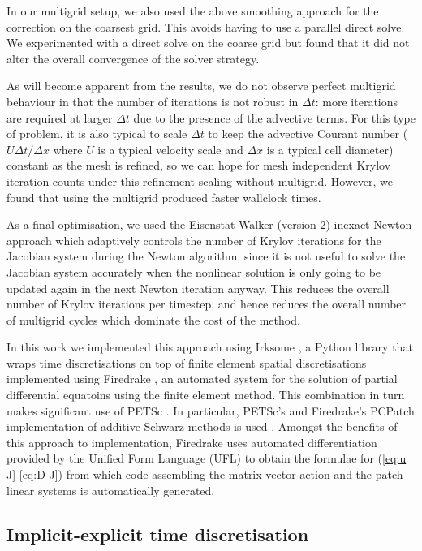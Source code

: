 \documentclass[a4paper, 12pt]{article}
\begin{document}
In our multigrid setup, we also used the above smoothing approach for
the correction on the coarsest grid. This avoids having to use a
parallel direct solve. We experimented with a direct solve on the coarse
grid but found that it did not alter the overall convergence of the
solver strategy.

As will become apparent from the results, we do not observe perfect
multigrid behaviour in that the number of iterations is not robust in
$\Delta t$: more iterations are required at larger $\Delta t$ due to
the presence of the advective terms.  For this type of problem, it is
also typical to scale $\Delta t$ to keep the advective Courant number
($U\Delta t/\Delta x$ where $U$ is a typical velocity scale and
$\Delta x$ is a typical cell diameter) constant as the mesh is
refined, so we can hope for mesh independent Krylov iteration counts
under this refinement scaling without multigrid. However, we found
that using the multigrid produced faster wallclock times.

As a final optimisation, we used the Eisenstat-Walker (version 2)
inexact Newton approach \citep{eisenstat1996choosing} which adaptively
controls the number of Krylov iterations for the Jacobian system
during the Newton algorithm, since it is not useful to solve the
Jacobian system accurately when the nonlinear solution is only going
to be updated again in the next Newton iteration anyway. This reduces the overall
number of Krylov iterations per timestep, and hence reduces the overall
number of multigrid cycles which dominate the cost of the method.

In this work we implemented this approach using Irksome
\citep{farrell2021irksome,kirby2024extending}, a Python library that
wraps time discretisations on top of finite element spatial
discretisations implemented using Firedrake
\citep{FiredrakeUserManual}, an automated system for the solution of
partial differential equatoins using the finite element method.  This
combination in turn makes significant use of PETSc
\citep{dalcin2011parallel,balay2019petsc}. In particular, PETSc's and
Firedrake's PCPatch implementation of additive Schwarz methods is used
\citep{farrell2021pcpatch}.  Amongst the benefits of this approach to
implementation, Firedrake uses automated differentiation provided by
the Unified Form Language (UFL) \citep{alnaes2012ufl} to obtain the
formulae for (\ref{eq:u J}-\ref{eq:D J}) from which code assembling
the matrix-vector action and the patch linear systems is automatically
generated.

\subsection{Implicit-explicit time discretisation}
\end{document}
